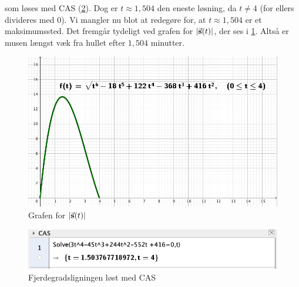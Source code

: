 \documentclass{article}
\begin{document}
som løses med CAS (\cref{fig:CAS}).
Dog er $t \approx 1,504$ den eneste løsning, da $t \neq 4$ (for ellers divideres med 0).
Vi mangler nu blot at redegøre for, at $t \approx 1,504$ er et maksimumssted. 
Det fremgår tydeligt ved grafen for $\abs{\va{s} (t)} $, der ses i \cref{fig:mus}.
Altså er musen længst væk fra hullet efter $1,504$ minutter. 
\begin{figure}[H]
\begin{center}
  \includegraphics[width=\textwidth]{mus.png}
\end{center}
  \caption{Grafen for $\abs{\va{s} (t)} $}
\label{fig:mus}
\end{figure}


\begin{figure}[H]
\begin{center}
  \includegraphics[width=\textwidth]{CAS.png}
\end{center}
\caption{Fjerdegradsligningen løst med CAS}
\label{fig:CAS}
\end{figure}
\end{document}
